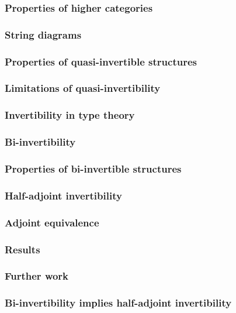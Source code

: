 \documentclass[presentation]{beamer}
\begin{document}
\begin{frame}
  \frametitle{Properties of higher categories}
\end{frame}

\begin{frame}
  \frametitle{String diagrams}
\end{frame}

\begin{frame}
  \frametitle{Properties of quasi-invertible structures}
\end{frame}

\begin{frame}
  \frametitle{Limitations of quasi-invertibility}
\end{frame}

\begin{frame}
  \frametitle{Invertibility in type theory}
\end{frame}

\begin{frame}
  \frametitle{Bi-invertibility}
\end{frame}

\begin{frame}
  \frametitle{Properties of bi-invertible structures}
\end{frame}

\begin{frame}
  \frametitle{Half-adjoint invertibility}
\end{frame}

\begin{frame}
  \frametitle{Adjoint equivalence}
\end{frame}

\begin{frame}
  \frametitle{Results}
\end{frame}

\begin{frame}
  \frametitle{Further work}
\end{frame}

\begin{frame}
  \frametitle{Bi-invertibility implies half-adjoint invertibility}
\end{frame}
\end{document}
